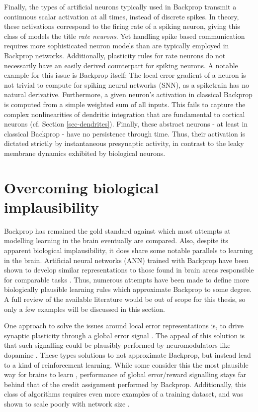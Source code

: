 Finally, the types of artificial neurons typically used in Backprop transmit a continuous scalar activation at all
times, instead of discrete spikes. In theory, these activations correspond to the firing rate of a spiking neuron,
giving this class of models the title \textit{rate neurons}. Yet handling spike based communication requires more
sophisticated neuron models than are typically employed in Backprop networks. Additionally, plasticity rules for rate
neurons do not necessarily have an easily derived counterpart for spiking neurons. A notable example for this issue is
Backprop itself; The local error gradient of a neuron is not trivial to compute for spiking neural networks (SNN), as a
spiketrain has no natural derivative. Furthermore, a given neuron's activation in classical Backprop is computed from a
simple weighted sum of all inputs. This fails to capture the complex nonlinearities of dendritic integration that are
fundamental to cortical neurons (cf. Section \ref{sec-dendrites}). Finally, these abstract neurons - at least in
classical Backprop - have no persistence through time. Thus, their activation is dictated strictly by instantaneous
presynaptic activity, in contrast to the leaky membrane dynamics exhibited by biological neurons.


\section{Overcoming biological implausibility}

Backprop has remained the gold standard against which most attempts at modelling learning in the brain eventually are
compared. Also, despite its apparent biological implausibility, it does share some notable parallels to learning in the
brain. Artificial neural networks (ANN) trained with Backprop have been shown to develop similar representations to
those found in brain areas responsible for comparable tasks
\citep{Yamins2016,Whittington2018,KhalighRazavi2014,Kubilius2016}. Thus, numerous attempts have been made to define more
biologically plausible learning rules which approximate Backprop to some degree. A full review of the available
literature would be out of scope for this thesis, so only a few examples will be discussed in this section. \newline


\noindent One approach to solve the issues around local error representations is, to drive synaptic plasticity through a
global error signal \citep{potjans2011imperfect,mozafari2018combining,sutton2018reinforcement}. The appeal of this
solution is that such signalling could be plausibly performed by neuromodulators like dopamine
\citep{Mazzoni1991,Seung2003,izhikevich2007solving}. These types solutions to not approximate Backprop, but instead lead
to a kind of reinforcement learning. While some consider this the most plausible way for brains to learn
\citep{sutton2018reinforcement}, performance of global error/reward signalling stays far behind that of the credit
assignment performed by Backprop. Additionally, this class of algorithms requires even more examples of a training
dataset, and was shown to scale poorly with network size \citep{Werfel2003}. 

